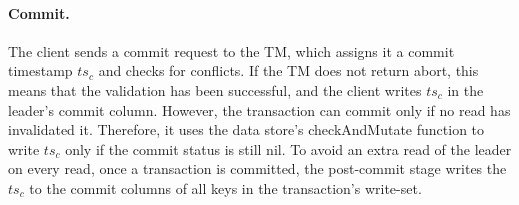 \paragraph{Commit.}
The client sends a commit request to the TM, which assigns it a commit timestamp $ts_c$ and checks for conflicts. 
If the TM does not return abort, this means that the validation has been successful, and the client writes $ts_c$ in the leader's {commit} column. 
However, the transaction can commit only if no read has invalidated it. Therefore, it uses 
the data store's checkAndMutate function to write $ts_c$ only if the commit status is still nil.
To avoid an extra read of the leader on every read, once a transaction is committed, the post-commit stage writes 
the $ts_c$ to the {commit} columns of all keys in  the transaction's write-set. 


